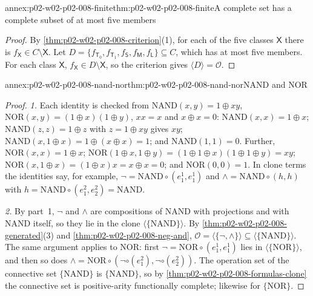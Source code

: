 \begin{annexitem}{annex:p02-w02-p02-008-finite}{thm:p02-w02-p02-008-finite}{A complete set has a complete subset of at most five members}
\begin{proof}
By \cref{thm:p02-w02-p02-008-criterion}(1), for each of the five classes
\(\mathsf X\) there is \(f_{\mathsf X}\in C\setminus\mathsf X\).  Let
\(D=\{f_{\mathsf T_0},f_{\mathsf T_1},f_{\mathsf S},f_{\mathsf M},
f_{\mathsf L}\}\subseteq C\), which has at most five members.  For each class
\(\mathsf X\), \(f_{\mathsf X}\in D\setminus\mathsf X\), so the criterion
gives \(\langle D\rangle=\mathcal O\).
\end{proof}
\end{annexitem}

\begin{annexitem}{annex:p02-w02-p02-008-nand-nor}{thm:p02-w02-p02-008-nand-nor}{NAND and NOR}
\begin{proof}
\emph{1.}  Each identity is checked from \(\mathrm{NAND}(x,y)=1\oplus xy\),
\(\mathrm{NOR}(x,y)=(1\oplus x)(1\oplus y)\), \(xx=x\) and \(x\oplus x=0\):
\(\mathrm{NAND}(x,x)=1\oplus x\);
\(\mathrm{NAND}(z,z)=1\oplus z\) with \(z=1\oplus xy\) gives \(xy\);
\(\mathrm{NAND}(x,1\oplus x)=1\oplus(x\oplus x)=1\); and
\(\mathrm{NAND}(1,1)=0\).  Further, \(\mathrm{NOR}(x,x)=1\oplus x\);
\(\mathrm{NOR}(1\oplus x,1\oplus y)=(1\oplus1\oplus x)(1\oplus1\oplus y)=xy\);
\(\mathrm{NOR}(x,1\oplus x)=(1\oplus x)x=x\oplus x=0\); and
\(\mathrm{NOR}(0,0)=1\).  In clone terms the identities say, for example,
\(\neg=\mathrm{NAND}\circ(e^1_1,e^1_1)\) and
\(\land=\mathrm{NAND}\circ(h,h)\) with
\(h=\mathrm{NAND}\circ(e^2_1,e^2_2)=\mathrm{NAND}\).

\emph{2.}  By part~1, \(\neg\) and \(\land\) are compositions of
\(\mathrm{NAND}\) with projections and with \(\mathrm{NAND}\) itself, so
they lie in the clone \(\langle\{\mathrm{NAND}\}\rangle\).  By
\cref{thm:p02-w02-p02-008-generated}(3) and
\cref{thm:p02-w02-p02-008-neg-and},
\(\mathcal O=\langle\{\neg,\land\}\rangle\subseteq
\langle\{\mathrm{NAND}\}\rangle\).  The same argument applies to
\(\mathrm{NOR}\): first \(\neg=\mathrm{NOR}\circ(e^1_1,e^1_1)\) lies in
\(\langle\{\mathrm{NOR}\}\rangle\), and then so does
\(\land=\mathrm{NOR}\circ(\neg\circ(e^2_1),\neg\circ(e^2_2))\).  The operation set of the connective
set \(\{\mathrm{NAND}\}\) is \(\{\mathrm{NAND}\}\), so by
\cref{thm:p02-w02-p02-008-formulas-clone} the connective set is
positive-arity functionally complete; likewise for \(\{\mathrm{NOR}\}\).


\end{proof}
\end{annexitem}
